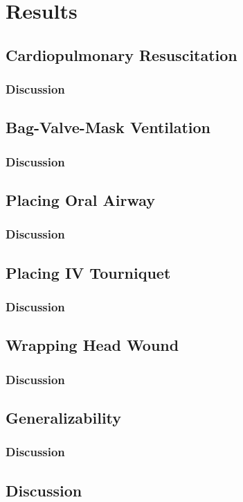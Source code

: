 
\chapter{Results}
\label{ch:Results}

\section{Cardiopulmonary Resuscitation}
\label{sec:Results:CPR}
\subsection{Discussion}
\label{sec:Results:CPR:Discussion}
\section{Bag-Valve-Mask Ventilation}
\label{sec:Results:BVM}
\subsection{Discussion}
\label{sec:Results:BVM:Discussion}
\section{Placing Oral Airway}
\label{sec:Results:Oral-Airway}
\subsection{Discussion}
\label{sec:Results:Oral-Airway:Discussion}
\section{Placing IV Tourniquet}
\label{sec:Results:Tourniquet}
\subsection{Discussion}
\label{sec:Results:Tourniquet:Discussion}
\section{Wrapping Head Wound}
\label{sec:Results:Wound}
\subsection{Discussion}
\label{sec:Results:Wound:Discussion}
\section{Generalizability}
\label{sec:Results:Generalizability}
\subsection{Discussion}
\label{sec:Results:Generalizability:Discussion}
\section{Discussion}
\label{sec:Results:Discussion}
